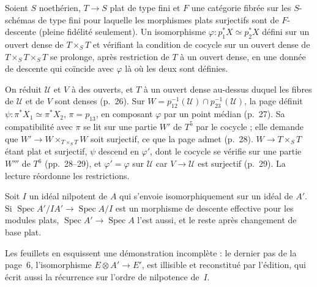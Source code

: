 \begin{encadre}
\begin{theoreme*}\nonverifie
Soient $S$ noethérien, $T \to S$ plat de type fini et $F$ une catégorie fibrée sur les $S$-schémas de type fini pour laquelle les morphismes plats surjectifs sont de $F$-descente (pleine fidélité seulement). Un isomorphisme $\varphi : p_1^*X \simeq p_2^*X$ défini sur un ouvert dense de $T \times_S T$ et vérifiant la condition de cocycle sur un ouvert dense de $T \times_S T \times_S T$ se prolonge, après restriction de $T$ à un ouvert dense, en une donnée de descente qui coïncide avec $\varphi$ là où les deux sont définies.
\end{theoreme*}
\end{encadre}
\begin{demopage}[pages 26 à 29]
On réduit $\mathcal U$ et $V$ à des ouverts, et $T$ à un ouvert dense au-dessus duquel les fibres de $\mathcal U$ et de $V$ sont denses (p.~26). Sur $W = p_{12}^{-1}(\mathcal U) \cap p_{23}^{-1}(\mathcal U)$, la page définit $\psi : \pi^*X_1 \simeq \pi^*X_2$, $\pi = p_{13}$, en composant $\varphi$ par un point médian (p.~27). Sa compatibilité avec $\pi$ se lit sur une partie $W'$ de $T^5$ par le cocycle ; elle demande que $W' \to W \times_{T \times_S T} W$ soit surjectif, ce que la page admet  (p.~28). $W \to T \times_S T$ étant plat et surjectif, $\psi$ descend en $\varphi'$, dont le cocycle se vérifie sur une partie $W'''$ de $T^6$ (pp.~28--29), et $\varphi' = \varphi$ sur $\mathcal U$ car $V \to \mathcal U$ est surjectif (p.~29). La lecture réordonne les restrictions.
\end{demopage}

\begin{encadre}
\begin{theoreme*}\nonverifie
Soit $I$ un idéal nilpotent de $A$ qui s'envoie isomorphiquement sur un idéal de $A'$. Si $\operatorname{Spec} A'/IA' \to \operatorname{Spec} A/I$ est un morphisme de descente effective pour les modules plats, $\operatorname{Spec} A' \to \operatorname{Spec} A$ l'est aussi, et le reste après changement de base plat.
\end{theoreme*}
\end{encadre}
{\small Les feuillets en esquissent une démonstration incomplète : le dernier pas de la page~6, l'isomorphisme $E \otimes A' \to E'$, est illisible et reconstitué par l'édition, qui écrit aussi la récurrence sur l'ordre de nilpotence de~$I$.\par}

